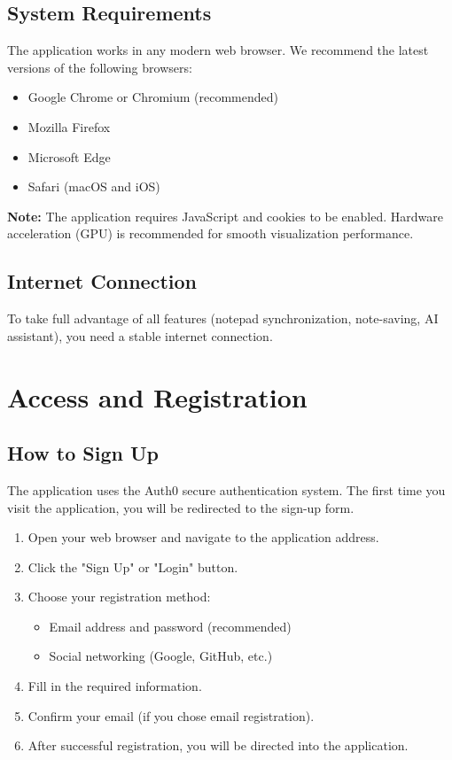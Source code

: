 \subsection{System Requirements}
The application works in any modern web browser. We recommend the latest versions of the following browsers:
\begin{itemize}
  \item Google Chrome or Chromium (recommended)
  \item Mozilla Firefox
  \item Microsoft Edge
  \item Safari (macOS and iOS)
\end{itemize}

\textbf{Note:} The application requires JavaScript and cookies to be enabled. Hardware acceleration (GPU) is recommended for smooth visualization performance.

\subsection{Internet Connection}
To take full advantage of all features (notepad synchronization, note-saving, AI assistant), you need a stable internet connection.

\section{Access and Registration}

\subsection{How to Sign Up}

The application uses the Auth0 secure authentication system. The first time you visit the application, you will be redirected to the sign-up form.

\begin{enumerate}
  \item Open your web browser and navigate to the application address.
  \item Click the "Sign Up" or "Login" button.
  \item Choose your registration method:
    \begin{itemize}
      \item Email address and password (recommended)
      \item Social networking (Google, GitHub, etc.)
    \end{itemize}
  \item Fill in the required information.
  \item Confirm your email (if you chose email registration).
  \item After successful registration, you will be directed into the application.
\end{enumerate}

